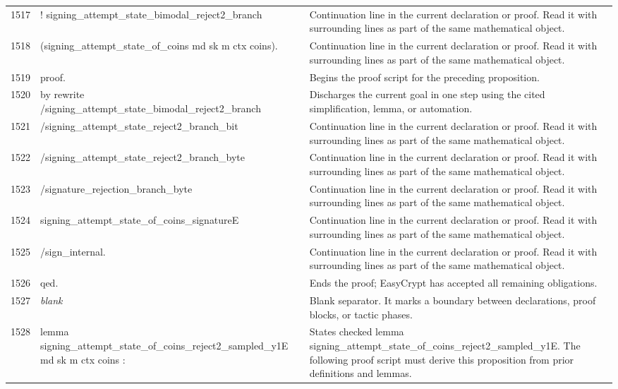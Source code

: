 \documentclass[10pt]{article}
\begin{document}
\begin{longtable}{r L{0.53\textwidth} L{0.37\textwidth}}
1517 & {\ttfamily\scriptsize   ! signing\_attempt\_state\_bimodal\_reject2\_branch} & Continuation line in the current declaration or proof.  Read it with surrounding lines as part of the same mathematical object. \\
1518 & {\ttfamily\scriptsize       (signing\_attempt\_state\_of\_coins md sk m ctx coins).} & Continuation line in the current declaration or proof.  Read it with surrounding lines as part of the same mathematical object. \\
1519 & {\ttfamily\scriptsize proof.} & Begins the proof script for the preceding proposition. \\
1520 & {\ttfamily\scriptsize by rewrite /signing\_attempt\_state\_bimodal\_reject2\_branch} & Discharges the current goal in one step using the cited simplification, lemma, or automation. \\
1521 & {\ttfamily\scriptsize            /signing\_attempt\_state\_reject2\_branch\_bit} & Continuation line in the current declaration or proof.  Read it with surrounding lines as part of the same mathematical object. \\
1522 & {\ttfamily\scriptsize            /signing\_attempt\_state\_reject2\_branch\_byte} & Continuation line in the current declaration or proof.  Read it with surrounding lines as part of the same mathematical object. \\
1523 & {\ttfamily\scriptsize            /signature\_rejection\_branch\_byte} & Continuation line in the current declaration or proof.  Read it with surrounding lines as part of the same mathematical object. \\
1524 & {\ttfamily\scriptsize            signing\_attempt\_state\_of\_coins\_signatureE} & Continuation line in the current declaration or proof.  Read it with surrounding lines as part of the same mathematical object. \\
1525 & {\ttfamily\scriptsize            /sign\_internal.} & Continuation line in the current declaration or proof.  Read it with surrounding lines as part of the same mathematical object. \\
1526 & {\ttfamily\scriptsize qed.} & Ends the proof; EasyCrypt has accepted all remaining obligations. \\
1527 & {\ttfamily\scriptsize \emph{blank}} & Blank separator.  It marks a boundary between declarations, proof blocks, or tactic phases. \\
1528 & {\ttfamily\scriptsize lemma signing\_attempt\_state\_of\_coins\_reject2\_sampled\_y1E md sk m ctx coins :} & States checked lemma signing\_attempt\_state\_of\_coins\_reject2\_sampled\_y1E.  The following proof script must derive this proposition from prior definitions and lemmas. \\

\end{longtable}
\end{document}
